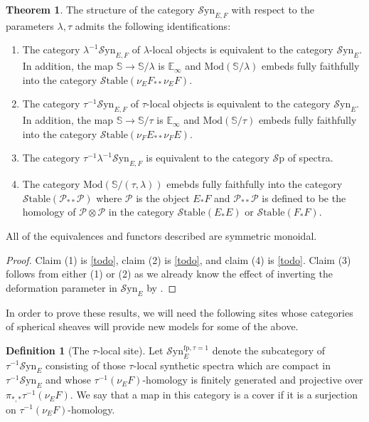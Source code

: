 \documentclass[10pt]{amsart}
\theoremstyle{definition}
\numberwithin{figure}{section}
\numberwithin{equation}{section}
\newtheorem{theorem}[figure]{Theorem}
\newtheorem{definition}[figure]{Definition}
\newcommand{\cP}{\mathcal{P}}
\theoremstyle{cited}
\newcommand{\bS}{\mathbb{S}}
\newcommand{\bE}{\mathbb{E}}
\newcommand{\Sp}{{\mathcal{S}\mathrm{p}}}
\newcommand{\Mod}{\mathrm{Mod}}
\newcommand{\fp}{\mathrm{fp}}
\newcommand{\Syn}{\mathcal{S}\mathrm{yn}}
\newcommand{\Stable}{\mathcal{S}\mathrm{table}}
\begin{document}
\begin{theorem}
  The structure of the category $\Syn_{E,F}$ with respect to the parameters $\lambda, \tau$ admits the following identifications:

  \begin{enumerate}
    \item The category $\lambda^{-1}\Syn_{E,F}$ of $\lambda$-local objects is equivalent to the category $\Syn_E$. In addition, the map $\bS\to \bS/\lambda$ is $\bE_\infty$ and $\Mod(\bS/\lambda)$ embeds fully faithfully into the category $\Stable(\nu_E F_{**}\nu_E F)$.
    \item The category $\tau^{-1}\Syn_{E,F}$ of $\tau$-local objects is equivalent to the category $\Syn_E$. In addition, the map $\bS\to \bS/\tau$ is $\bE_\infty$ and $\Mod(\bS/\tau)$ embeds fully faithfully into the category $\Stable(\nu_F E_{**}\nu_F E)$.
    \item The category $\tau^{-1}\lambda^{-1}\Syn_{E,F}$ is equivalent to the category $\Sp$ of spectra.
    \item The category $\Mod(\bS/(\tau,\lambda))$ emebds fully faithfully into the category $\Stable(\cP_{**}\cP)$ where $\cP$ is the object $E_*F$ and $\cP_{**}\cP$ is defined to be the homology of $\cP\otimes \cP$ in the category $\Stable(E_*E)$ or $\Stable(F_*F)$.
  \end{enumerate}
  All of the equivalences and functors described are symmetric monoidal.
  
\end{theorem}

\begin{proof}
  Claim (1) is \ref{todo}, claim (2) is \ref{todo}, and claim (4) is \ref{todo}. Claim (3) follows from either (1) or (2) as we already know the effect of inverting the deformation parameter in $\Syn_E$ by \cite{todo}.
\end{proof}

In order to prove these results, we will need the following sites whose categories of spherical sheaves will provide new models for some of the above.

\begin{definition}[The $\tau$-local site]
  Let $\Syn_E^{\fp, \tau=1}$ denote the subcategory of $\tau^{-1}\Syn_E$ consisting of those $\tau$-local synthetic spectra which are compact in $\tau^{-1}\Syn_E$ and whose $\tau^{-1}(\nu_E F)$-homology is finitely generated and projective over $\pi_{*,*}\tau^{-1}(\nu_E F)$. We say that a map in this category is a cover if it is a surjection on $\tau^{-1}(\nu_E F)$-homology.
\end{definition}
\end{document}
